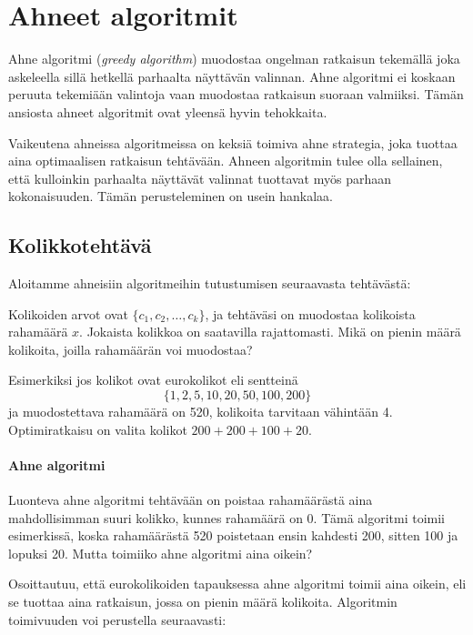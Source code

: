 \chapter{Ahneet algoritmit}


Ahne algoritmi (\textit{greedy algorithm})
muodostaa ongelman ratkaisun
tekemällä joka askeleella
sillä hetkellä parhaalta näyttävän valinnan.
Ahne algoritmi ei koskaan 
peruuta tekemiään valintoja vaan
muodostaa ratkaisun suoraan valmiiksi.
Tämän ansiosta ahneet algoritmit ovat
yleensä hyvin tehokkaita.

Vaikeutena ahneissa algoritmeissa on
keksiä toimiva ahne strategia,
joka tuottaa aina optimaalisen ratkaisun tehtävään.
Ahneen algoritmin tulee olla sellainen,
että kulloinkin parhaalta näyttävät valinnat
tuottavat myös parhaan kokonaisuuden.
Tämän perusteleminen on usein hankalaa.

\section{Kolikkotehtävä}

Aloitamme ahneisiin algoritmeihin tutustumisen
seuraavasta tehtävästä:

\begin{task}
Kolikoiden arvot ovat $\{c_1,c_2,\ldots,c_k\}$,
ja tehtäväsi on muodostaa kolikoista rahamäärä $x$.
Jokaista kolikkoa on saatavilla rajattomasti.
Mikä on pienin määrä kolikoita,
joilla rahamäärän voi muodostaa?
\end{task}

\noindent
Esimerkiksi jos kolikot ovat eurokolikot eli sentteinä
\[\{1,2,5,10,20,50,100,200\}\]
ja muodostettava rahamäärä on 520,
kolikoita tarvitaan vähintään 4.
Optimiratkaisu on valita kolikot $200+200+100+20$.

\subsubsection{Ahne algoritmi}

Luonteva ahne algoritmi tehtävään
on poistaa rahamäärästä aina mahdollisimman
suuri kolikko, kunnes rahamäärä on 0.
Tämä algoritmi toimii esimerkissä,
koska rahamäärästä 520 
poistetaan ensin kahdesti 200, sitten 100
ja lopuksi 20.
Mutta toimiiko ahne algoritmi aina oikein?

Osoittautuu, että eurokolikoiden tapauksessa
ahne algoritmi toimii aina oikein,
eli se tuottaa aina ratkaisun,
jossa on pienin määrä kolikoita.
Algoritmin toimivuuden voi perustella
seuraavasti:

